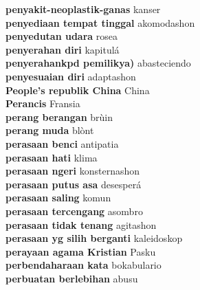 \textbf{ penyakit-neoplastik-ganas  } kanser \\
\textbf{ penyediaan tempat tinggal  } akomodashon \\
\textbf{ penyedutan udara  } rosea \\
\textbf{ penyerahan diri  } kapitulá \\
\textbf{ penyerahankpd pemilikya)  } abasteciendo \\
\textbf{ penyesuaian diri  } adaptashon \\
\textbf{ People’s republik China  } China \\
\textbf{ Perancis  } Fransia \\
\textbf{ perang berangan  } brùin \\
\textbf{ perang muda  } blònt \\
\textbf{ perasaan benci  } antipatia \\
\textbf{ perasaan hati  } klima \\
\textbf{ perasaan ngeri  } konsternashon \\
\textbf{ perasaan putus asa  } desesperá \\
\textbf{ perasaan saling  } komun \\
\textbf{ perasaan tercengang  } asombro \\
\textbf{ perasaan tidak tenang  } agitashon \\
\textbf{ perasaan yg silih berganti  } kaleidoskop \\
\textbf{ perayaan agama Kristian  } Pasku \\
\textbf{ perbendaharaan kata  } bokabulario \\
\textbf{ perbuatan berlebihan  } abusu \\
